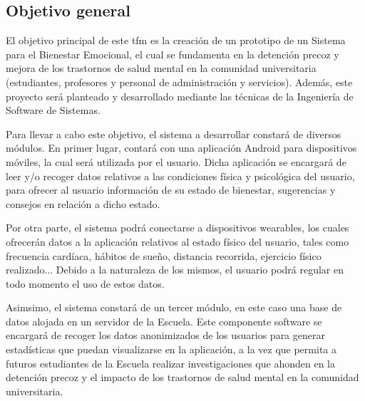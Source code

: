     \subsection{Objetivo general}

        El objetivo principal de este \gls{tfm} es la creación de un prototipo de un Sistema para el Bienestar Emocional, el cual se fundamenta en la detención precoz y mejora de los trastornos de salud mental en la comunidad universitaria (estudiantes, profesores y personal de administración y servicios). Además, este proyecto será planteado y desarrollado mediante las técnicas de la Ingeniería de Software de Sistemas.
    
        Para llevar a cabo este objetivo, el sistema a desarrollar constará de diversos módulos. En primer lugar, contará con una aplicación Android para dispositivos móviles, la cual será utilizada por el usuario. Dicha aplicación se encargará de leer y/o recoger datos relativos a las condiciones física y psicológica del usuario, para ofrecer al usuario información de su estado de bienestar, sugerencias y consejos en relación a dicho estado.
    
        Por otra parte, el sistema podrá conectarse a dispositivos \glspl{wearable}, los cuales ofrecerán datos a la aplicación relativos al estado físico del usuario, tales como frecuencia cardíaca, hábitos de sueño, distancia recorrida, ejercicio físico realizado... Debido a la naturaleza de los mismos, el usuario podrá regular en todo momento el uso de estos datos.
    
        Asimsimo, el sistema constará de un tercer módulo, en este caso una base de datos alojada en un servidor de la Escuela. Este componente software se encargará de recoger los datos anonimizados de los usuarios para generar estadísticas que puedan visualizarse en la aplicación, a la vez que permita a futuros estudiantes de la Escuela realizar investigaciones que ahonden en la detención precoz y el impacto de los trastornos de salud mental en la comunidad universitaria.

